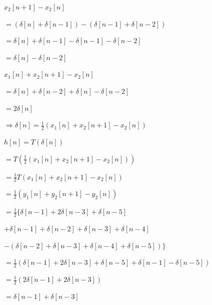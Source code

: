 \documentclass[fleqn]{article}
\begin{document}
\begin{enumerate}[nolistsep]
\begin{enumerate}
			$x_2[n+1] - x_2[n]$
			
			$ = (\delta[n] + \delta[n-1]) - (\delta[n-1] + \delta[n-2])$
			
			$ = \delta[n] + \delta[n-1] - \delta[n-1] - \delta[n-2]$
			
			$ = \delta[n] - \delta[n-2]$
			
			$x_1[n] + x_2[n+1] - x_2[n]$
			
			$ = \delta[n] + \delta[n-2] + \delta[n] - \delta[n-2]$
			
			$ = 2\delta[n]$
			
			$\Rightarrow \delta[n] = \frac{1}{2}(x_1[n] + x_2[n+1] - x_2[n])$
			
			$h[n] = T(\delta[n])$
			
			$ = T(\frac{1}{2}(x_1[n] + x_2[n+1] - x_2[n]))$
			
			$ = \frac{1}{2}T(x_1[n] + x_2[n+1] - x_2[n])$
			
			$ = \frac{1}{2}(y_1[n] + y_2[n+1] - y_2[n])$
			
			$ = \frac{1}{2}\{\delta[n-1] + 2\delta[n-3] + \delta[n-5]$
			
			$ + \delta[n-1] + \delta[n-2] + \delta[n-3] + \delta[n-4]$
			
			$ - (\delta[n-2] + \delta[n-3] + \delta[n-4] + \delta[n-5])\}$
			
			$ = \frac{1}{2}(\delta[n-1] + 2\delta[n-3] + \delta[n-5] + \delta[n-1] - \delta[n-5])$
			
			$ = \frac{1}{2}(2\delta[n-1] + 2\delta[n-3])$
			
			$ = \delta[n-1] + \delta[n-3]$
			\end{enumerate}
		
	\end{enumerate}
\end{document}
